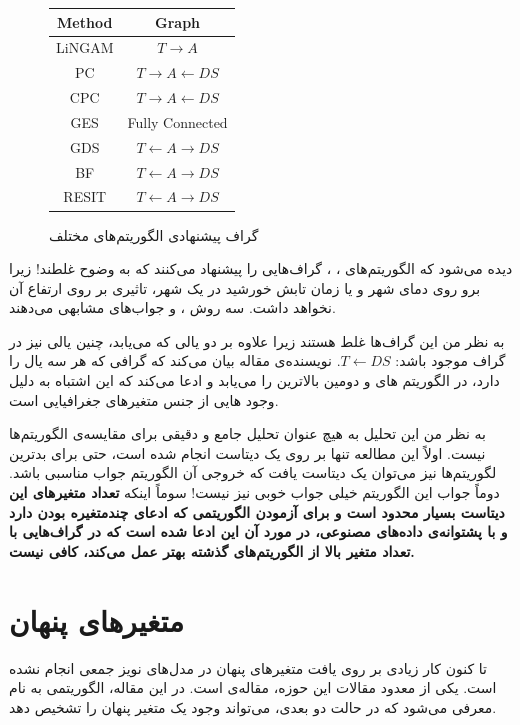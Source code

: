 \documentclass[a4paper,12pt]{article}
\begin{document}
\begin{center}

\begin{figure}
\centering
\begin{latin}
\begin{tabular}{| c| c |}
\hline
Method & Graph \\
\hline\hline
LiNGAM & $T \rightarrow A$ \\
\hline
PC &  $T \rightarrow A \leftarrow DS$ \\
\hline
CPC& $T \rightarrow A \leftarrow DS$ \\
\hline
GES& Fully Connected\\
\hline
GDS& $T \leftarrow A \rightarrow DS$\\
\hline
BF& $T \leftarrow A \rightarrow DS$\\
\hline
RESIT&$T \leftarrow A \rightarrow DS$\\
\hline
\end{tabular}
\end{latin}
\caption{گراف پیشنهادی الگوریتم‌های مختلف}
\end{figure}

\end{center}
دیده می‌شود که الگوریتم‌های 
،
،
گراف‌هایی را پیشنهاد می‌کنند که به وضوح غلطند! زیرا 
برو روی دمای شهر و یا زمان تابش خورشید در یک شهر، تاثیری بر روی ارتفاع آن نخواهد داشت. سه روش 
،
و
جواب‌های مشابهی می‌دهند. 

به نظر من این گراف‌ها غلط هستند زیرا علاوه بر دو یالی که 
می‌یابد،  چنین یالی نیز در گراف موجود باشد: $T \leftarrow DS$. نویسنده‌ی مقاله بیان می‌کند که گرافی که هر سه یال را دارد، در الگوریتم های 
و
دومین بالاترین 
را می‌یابد و ادعا می‌کند که این اشتباه به دلیل وجود 
هایی از جنس متغیر‌های جغرافیایی است. 

به نظر من این تحلیل به هیچ عنوان تحلیل جامع و دقیقی برای مقایسه‌ی الگوریتم‌ها نیست. اولاً این مطالعه تنها بر روی یک دیتاست انجام شده است، حتی برای بدترین لگوریتم‌ها نیز می‌توان یک دیتاست یافت که خروجی آن الگوریتم جواب مناسبی باشد. دوماً جواب این الگوریتم خیلی جواب خوبی نیز نیست! سوماً اینکه 
\textbf{
تعداد متغیر‌های این دیتاست بسیار محدود است و برای آزمودن الگوریتمی که ادعای چندمتغیره بودن دارد و با پشتوانه‌ی داده‌های مصنوعی، در مورد آن این ادعا شده است که در گراف‌هایی با تعداد متغیر بالا از الگوریتم‌های گذشته بهتر عمل می‌کند، کافی نیست.}

\section{متغیر‌های پنهان}
تا کنون کار زیادی بر روی یافت متغیر‌های پنهان در مدل‌های نویز جمعی انجام نشده است. یکی از معدود مقالات این حوزه، مقاله‌ی 
\cite{confounder}
است. در این مقاله، الگوریتمی به نام 
معرفی می‌شود که در حالت دو بعدی، می‌تواند وجود یک متغیر پنهان را تشخیص دهد.
\end{document}
